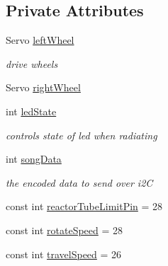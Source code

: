 \subsection*{Private Attributes}
\begin{DoxyCompactItemize}
\item 
Servo \hyperlink{classRobot_af357e059c6c07190c92c6c9a00e2b8af}{left\-Wheel}
\begin{DoxyCompactList}\small\item\em drive wheels \end{DoxyCompactList}\item 
Servo \hyperlink{classRobot_a3b2dd5b89e44fd3a7ba239554fb5b8a7}{right\-Wheel}
\item 
int \hyperlink{classRobot_a3c7308c71db125a8840f9c82b5fec9ca}{led\-State}
\begin{DoxyCompactList}\small\item\em controls state of led when radiating \end{DoxyCompactList}\item 
int \hyperlink{classRobot_a7818916adfa736ab4cb21011fe302cdb}{song\-Data}
\begin{DoxyCompactList}\small\item\em the encoded data to send over i2\-C \end{DoxyCompactList}\item 
const int \hyperlink{classRobot_a351d754436c8f569432ef7a06641f98a}{reactor\-Tube\-Limit\-Pin} = 28
\item 
const int \hyperlink{classRobot_a4063d601b5b4d5aad332f617abb36c7b}{rotate\-Speed} = 28
\item 
const int \hyperlink{classRobot_a87ec942d7d53b1a4b1c46422f6a134eb}{travel\-Speed} = 26
\end{DoxyCompactItemize}
